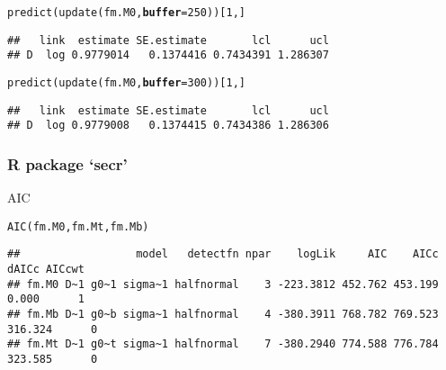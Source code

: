 \documentclass[color=usenames,dvipsnames]{beamer}\usepackage[]{graphicx}\usepackage[]{color}
\makeatletter
\newcommand{\hlnum}[1]{\textcolor[rgb]{0.69,0.494,0}{#1}}%
\newcommand{\hlstd}[1]{\textcolor[rgb]{0,0,0}{#1}}%
\newcommand{\hlkwc}[1]{\textcolor[rgb]{0,0,0}{\textbf{#1}}}%
\newcommand{\hlkwd}[1]{\textcolor[rgb]{0.004,0.004,0.506}{#1}}%
\newenvironment{kframe}{%
 \def\at@end@of@kframe{}%
 \ifinner\ifhmode%
  \def\at@end@of@kframe{\end{minipage}}%
  \begin{minipage}{\columnwidth}%
 \fi\fi%
 \def\FrameCommand##1{\hskip\@totalleftmargin \hskip-\fboxsep
 \colorbox{shadecolor}{##1}\hskip-\fboxsep
     \hskip-\linewidth \hskip-\@totalleftmargin \hskip\columnwidth}%
 \MakeFramed {\advance\hsize-\width
   \@totalleftmargin\z@ \linewidth\hsize
   \@setminipage}}%
 {\par\unskip\endMakeFramed%
 \at@end@of@kframe}
\newenvironment{knitrout}{}{} %
\makeatother
\begin{document}
\begin{frame}[fragile]
\begin{knitrout}
\begin{kframe}
\begin{alltt}
\hlkwd{predict}\hlstd{(}\hlkwd{update}\hlstd{(fm.M0,} \hlkwc{buffer}\hlstd{=}\hlnum{250}\hlstd{))[}\hlnum{1}\hlstd{,]}
\end{alltt}
\begin{verbatim}
##   link  estimate SE.estimate       lcl      ucl
## D  log 0.9779014   0.1374416 0.7434391 1.286307
\end{verbatim}
\end{kframe}
\end{knitrout}
\pause
\vspace{-12pt}
\begin{knitrout}\scriptsize
{}\color{fgcolor}\begin{kframe}
\begin{alltt}
\hlkwd{predict}\hlstd{(}\hlkwd{update}\hlstd{(fm.M0,} \hlkwc{buffer}\hlstd{=}\hlnum{300}\hlstd{))[}\hlnum{1}\hlstd{,]}
\end{alltt}
\begin{verbatim}
##   link  estimate SE.estimate       lcl      ucl
## D  log 0.9779008   0.1374415 0.7434386 1.286306
\end{verbatim}
\end{kframe}
\end{knitrout}
\end{frame}



\begin{frame}[fragile]
  \frametitle{R package `secr'}
  AIC
\begin{knitrout}\tiny
{}\color{fgcolor}\begin{kframe}
\begin{alltt}
\hlkwd{AIC}\hlstd{(fm.M0, fm.Mt, fm.Mb)}
\end{alltt}


{\ttfamily\noindent\color{warningcolor}{\#\# Warning in AIC.secr(fm.M0, fm.Mt, fm.Mb): models not compatible for AIC}}\begin{verbatim}
##                  model   detectfn npar    logLik     AIC    AICc   dAICc AICcwt
## fm.M0 D~1 g0~1 sigma~1 halfnormal    3 -223.3812 452.762 453.199   0.000      1
## fm.Mb D~1 g0~b sigma~1 halfnormal    4 -380.3911 768.782 769.523 316.324      0
## fm.Mt D~1 g0~t sigma~1 halfnormal    7 -380.2940 774.588 776.784 323.585      0
\end{verbatim}
\end{kframe}
\end{knitrout}
\end{frame}
\end{document}
